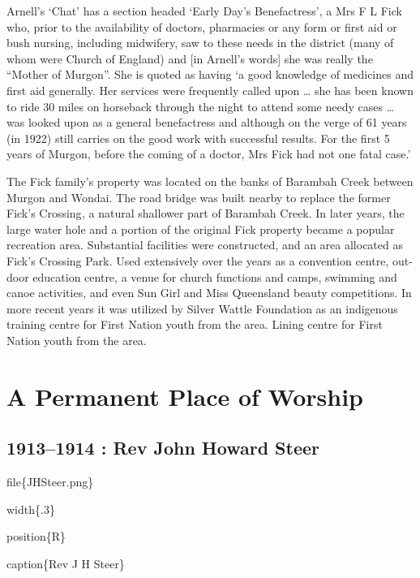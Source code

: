 Arnell's `Chat' has a section headed `Early Day's Benefactress', a Mrs F
L Fick who, prior to the availability of doctors, pharmacies or any form
or first aid or bush nursing, including midwifery, saw to these needs in
the district (many of whom were Church of England) and {[}in Arnell's
words{]} she was really the ``Mother of Murgon''. She is quoted as
having `a good knowledge of medicines and first aid generally. Her
services were frequently called upon \ldots{} she has been known to ride
30 miles on horseback through the night to attend some needy cases
\ldots{} was looked upon as a general benefactress and although on the
verge of 61 years (in 1922) still carries on the good work with
successful results. For the first 5 years of Murgon, before the coming
of a doctor, Mrs Fick had not one fatal case.'

The Fick family's property was located on the banks of Barambah Creek
between Murgon and Wondai. The road bridge was built nearby to replace
the former Fick's Crossing\emph{,} a natural shallower part of Barambah
Creek. In later years, the large water hole and a portion of the
original Fick property became a popular recreation area. Substantial
facilities were constructed, and an area allocated as Fick's Crossing
Park\emph{.} Used extensively over the years as a convention centre,
out-door education centre, a venue for church functions and camps,
swimming and canoe activities, and even Sun Girl and Miss Queensland
beauty competitions. In more recent years it was utilized by Silver
Wattle Foundation as an indigenous training centre for First Nation
youth from the area. Lining centre for First Nation youth from the area.

\hypertarget{a-permanent-place-of-worship}{%
\chapter{A Permanent Place of
Worship}\label{a-permanent-place-of-worship}}

\hypertarget{rev-john-howard-steer}{%
\section{1913--1914 : Rev John Howard
Steer}\label{rev-john-howard-steer}}

file\{JHSteer.png\}

width\{.3\}

position\{R\}

caption\{Rev J H Steer\}

